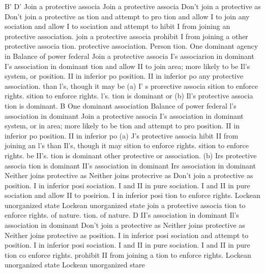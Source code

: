 \documentclass[11pt,openany]{book}
\begin{document}
{B' D' Join a protective associa Join a protective associa Don't join a protective as Don't join a protective as tion and attempt to pro tion and allow I to join any sociation and allow I to sociation and attempt to hibit I from joining an protective association. join a protective associa prohibit I from joining a other protective associa tion. protective association. Person tion. One dominant agency in Balance of power federal Join a protective associa I's associarion in dominant I's association in dominant tion and allow II to join area; more likely to be Il's system, or position. II in inferior po position. II in inferior po any protective association. than l's, though it may be (a) I' s prorective associa sition to enforce rights. sition to enforce rights. l's. tion is dominant or (b) Il's protective associa tion is dominant. B One dominant association Balance of power federal l's association in dominant Join a protective associa I's association in dominant system, or in area; more likely to be tion and attempt to pro position. II in inferior po position. II in inferior po (a) J's protective associa hibit II from joining an l's than Il's, though it may sition to enforce rights. sition to enforce rights. be II's. tion is dominant other protective or association. (b) Irs protective associa tion is dominant II's association in dominant Irs association in dominant Neither joins protective as Neither joins protecrive as Don't join a protective as position. I in inferior posi sociation. I and II in pure sociation. I and II in pure sociation and allow II to posirion. I in inferior posi tion to enforce rights. Lockean unorganized state Lockean unorganized state join a protective associa tion to enforce rights. of nature. tion. of nature. D II's association in dominant Il's association in dominant Don't join a protective as Neither joins protective as Neither joins protective as position. I in inferior posi sociation and attempt to position. I in inferior posi sociation. I and II in pure sociation. I and II in pure tion co enforce rights. prohibit II from joining a tion to enforce rights. Lockean unorganized state Lockean unorganized stare\par

}
\end{document}
